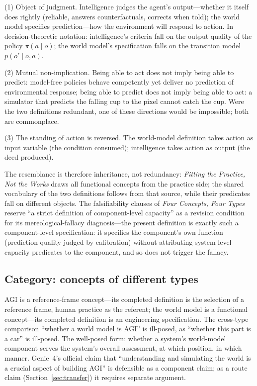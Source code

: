 \documentclass[10pt]{article}
\begin{document}
(1) Object of judgment. Intelligence judges the agent's output---whether it itself does rightly (reliable, answers counterfactuals, corrects when told); the world model specifies prediction---how the environment will respond to action. In decision-theoretic notation: intelligence's criteria fall on the output quality of the policy $\pi(a\mid o)$; the world model's specification falls on the transition model $p(o'\mid o,a)$.

(2) Mutual non-implication. Being able to act does not imply being able to predict: model-free policies behave competently yet deliver no prediction of environmental response; being able to predict does not imply being able to act: a simulator that predicts the falling cup to the pixel cannot catch the cup. Were the two definitions redundant, one of these directions would be impossible; both are commonplace.

(3) The standing of action is reversed. The world-model definition takes action as input variable (the condition consumed); intelligence takes action as output (the deed produced).

The resemblance is therefore inheritance, not redundancy: \emph{Fitting the Practice, Not the Works}\cite{yu2026fitting} draws all functional concepts from the practice side; the shared vocabulary of the two definitions follows from that source, while their predicates fall on different objects. The falsifiability clauses of \emph{Four Concepts, Four Types} reserve ``a strict definition of component-level capacity'' as a revision condition for its mereological-fallacy diagnosis---the present definition is exactly such a component-level specification: it specifies the component's own function (prediction quality judged by calibration) without attributing system-level capacity predicates to the component, and so does not trigger the fallacy.

\subsection{Category: concepts of different types}\label{sec:category}

AGI is a reference-frame concept---its completed definition is the selection of a reference frame, human practice as the referent\cite{yu2026fourconcepts}; the world model is a functional concept---its completed definition is an engineering specification. The cross-type comparison ``whether a world model is AGI'' is ill-posed, as ``whether this part is a car'' is ill-posed. The well-posed form: whether a system's world-model component serves the system's overall assessment, at which position, in which manner. Genie~4's official claim that ``understanding and simulating the world is a crucial aspect of building AGI''\cite{deepmind2026genie4} is defensible as a component claim; as a route claim (Section~\ref{sec:transfer}) it requires separate argument.
\end{document}
